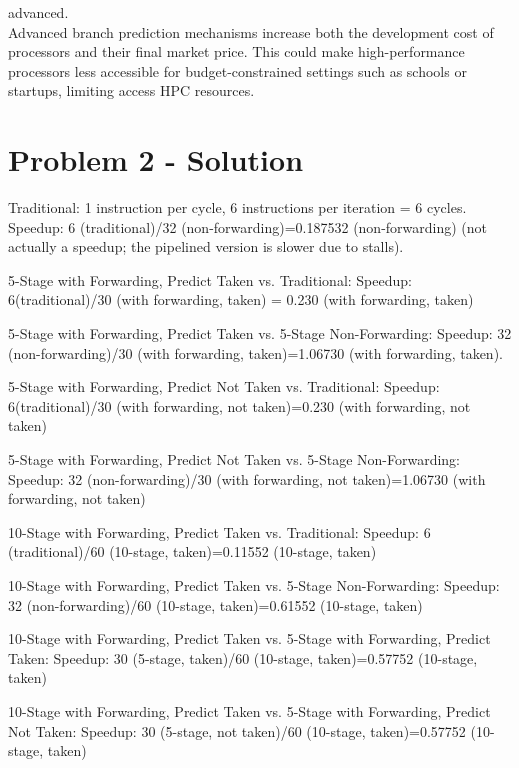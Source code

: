 \documentclass[11pt]{article}
\begin{document}
advanced. \\

Advanced branch prediction mechanisms increase both the development cost of processors and their final market price. This could make high-performance processors less accessible for budget-constrained settings such as schools or startups, limiting access HPC resources. 

\section*{Problem 2 - Solution}
Traditional: 1 instruction per cycle, 6 instructions per iteration = 6 cycles.
Speedup: 6 (traditional)/32 (non-forwarding)=0.187532 (non-forwarding) (not actually a speedup; the pipelined version is slower due to stalls).

5-Stage with Forwarding, Predict Taken vs. Traditional:
Speedup: 6(traditional)/30 (with forwarding, taken) = 0.230 (with forwarding, taken)

5-Stage with Forwarding, Predict Taken vs. 5-Stage Non-Forwarding:
Speedup: 32 (non-forwarding)/30 (with forwarding, taken)=1.06730 (with forwarding, taken).

5-Stage with Forwarding, Predict Not Taken vs. Traditional:
Speedup: 6(traditional)/30 (with forwarding, not taken)=0.230 (with forwarding, not taken)

5-Stage with Forwarding, Predict Not Taken vs. 5-Stage Non-Forwarding:
Speedup: 32 (non-forwarding)/30 (with forwarding, not taken)=1.06730 (with forwarding, not taken)

10-Stage with Forwarding, Predict Taken vs. Traditional:
Speedup: 6 (traditional)/60 (10-stage, taken)=0.11552 (10-stage, taken)

10-Stage with Forwarding, Predict Taken vs. 5-Stage Non-Forwarding:
Speedup: 32 (non-forwarding)/60 (10-stage, taken)=0.61552 (10-stage, taken)

10-Stage with Forwarding, Predict Taken vs. 5-Stage with Forwarding, Predict Taken:
Speedup: 30 (5-stage, taken)/60 (10-stage, taken)=0.57752 (10-stage, taken)

10-Stage with Forwarding, Predict Taken vs. 5-Stage with Forwarding, Predict Not Taken:
Speedup: 30 (5-stage, not taken)/60 (10-stage, taken)=0.57752 (10-stage, taken)
\end{document}
